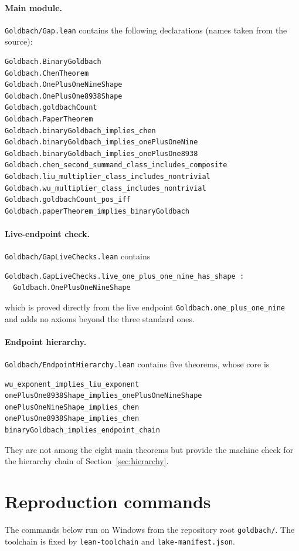 \documentclass[11pt,a4paper]{article}
\theoremstyle{plain}
\theoremstyle{definition}
\begin{document}
\paragraph{Main module.}
\texttt{Goldbach/Gap.lean} contains the following declarations (names taken from the source):

\begin{verbatim}
Goldbach.BinaryGoldbach
Goldbach.ChenTheorem
Goldbach.OnePlusOneNineShape
Goldbach.OnePlusOne8938Shape
Goldbach.goldbachCount
Goldbach.PaperTheorem
Goldbach.binaryGoldbach_implies_chen
Goldbach.binaryGoldbach_implies_onePlusOneNine
Goldbach.binaryGoldbach_implies_onePlusOne8938
Goldbach.chen_second_summand_class_includes_composite
Goldbach.liu_multiplier_class_includes_nontrivial
Goldbach.wu_multiplier_class_includes_nontrivial
Goldbach.goldbachCount_pos_iff
Goldbach.paperTheorem_implies_binaryGoldbach
\end{verbatim}

\paragraph{Live-endpoint check.}
\texttt{Goldbach/GapLiveChecks.lean} contains
\begin{verbatim}
Goldbach.GapLiveChecks.live_one_plus_one_nine_has_shape :
  Goldbach.OnePlusOneNineShape
\end{verbatim}
which is proved directly from the live endpoint \texttt{Goldbach.one\_plus\_one\_nine} and adds no axioms beyond the three standard ones.

\paragraph{Endpoint hierarchy.}
\texttt{Goldbach/EndpointHierarchy.lean} contains five theorems, whose core is
\begin{verbatim}
wu_exponent_implies_liu_exponent
onePlusOne8938Shape_implies_onePlusOneNineShape
onePlusOneNineShape_implies_chen
onePlusOne8938Shape_implies_chen
binaryGoldbach_implies_endpoint_chain
\end{verbatim}
They are not among the eight main theorems but provide the machine check for the hierarchy chain of Section~\ref{sec:hierarchy}.

\section{Reproduction commands}
\label{app:reproduce}

The commands below run on Windows from the repository root \texttt{goldbach/}. The toolchain is fixed by \texttt{lean-toolchain} and \texttt{lake-manifest.json}.
\end{document}
